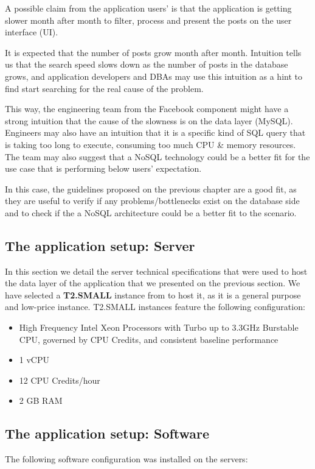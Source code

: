 A possible claim from the application users' is that the application is getting slower month after month to filter, process and present the posts on  the user interface (UI). 

It is expected that the number of posts grow month after month. Intuition tells us that the search speed slows down as the number of posts in the database grows, and application developers and DBAs may use this intuition as a hint to find start searching for the real cause of the problem. 

This way, the engineering team from the Facebook component might have a strong intuition that the cause of the slowness is on the data layer (MySQL). Engineers may also have an intuition that it is a specific kind of SQL query that is taking too long to execute, consuming too much CPU \& memory resources. The team may also suggest that a NoSQL technology could be a better fit for the use case that is performing below users' expectation. 

In this case, the guidelines proposed on the previous chapter are a good fit, as they are useful to verify if any problems/bottlenecks exist on the database side and to check if the a NoSQL architecture could be a better fit to the scenario.


\subsection{The application setup: Server}

In this section we detail the server technical specifications that were used to host the data layer of the application that we presented on the previous section. We have selected a \textbf{T2.SMALL} instance from \cite{amazonec2} to host it, as it is a general purpose and low-price instance. T2.SMALL instances feature the following configuration:

\begin{itemize}
\item{High Frequency Intel Xeon Processors with Turbo up to 3.3GHz Burstable CPU, governed by CPU Credits, and consistent baseline performance}
\item{1 vCPU}
\item{12 CPU Credits/hour}
\item{2 GB RAM}
\end{itemize}

\subsection{The application setup: Software}
The following software configuration was installed on the servers: 

